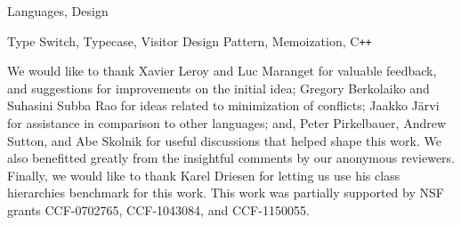 \documentclass[10pt]{sigplanconf}
\DeclareRobustCommand{\Cpp}{C\texttt{++}}
\begin{document}
\begin{abstract}
%
\end{abstract}


\terms
Languages, Design

\keywords
Type Switch, Typecase, Visitor Design Pattern, Memoization, \Cpp{}




%
%





\acks

We would like to thank Xavier Leroy and Luc Maranget for valuable feedback, and 
suggestions for improvements on the initial idea; Gregory Berkolaiko and 
Suhasini Subba Rao for ideas related to minimization of conflicts; Jaakko 
J\"arvi for assistance in comparison to other languages; and, Peter Pirkelbauer, 
Andrew Sutton, and Abe Skolnik for useful discussions that helped shape this 
work. We also benefitted greatly from the insightful comments by our anonymous 
reviewers. Finally, we would like to thank Karel Driesen for letting us use his 
class hierarchies benchmark for this work. This work was partially 
supported by NSF grants CCF-0702765, CCF-1043084, and CCF-1150055.



\end{document}
